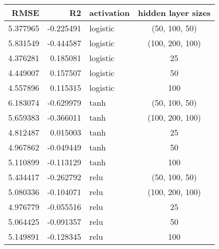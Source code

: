 \begin{tabular}{rrlc}
\toprule
  RMSE & R2 & activation & hidden layer sizes \\
\midrule
 5.377965 & -0.225491 & logistic & (50, 100, 50) \\
 5.831549 & -0.444587 & logistic & (100, 200, 100) \\
 4.376281 & 0.185081 & logistic & 25 \\
 4.449007 & 0.157507 & logistic & 50 \\
 4.557896 & 0.115315 & logistic & 100 \\
 6.183074 & -0.629979 & tanh & (50, 100, 50) \\
 5.659383 & -0.366011 & tanh & (100, 200, 100) \\
 4.812487 & 0.015003 & tanh & 25 \\
 4.967862 & -0.049449 & tanh & 50 \\
 5.110899 & -0.113129 & tanh & 100 \\
 5.434417 & -0.262792 & relu & (50, 100, 50) \\
 5.080336 & -0.104071 & relu & (100, 200, 100) \\
 4.976779 & -0.055516 & relu & 25 \\
 5.064425 & -0.091357 & relu & 50 \\
 5.149891 & -0.128345 & relu & 100 \\
\bottomrule
\end{tabular}
